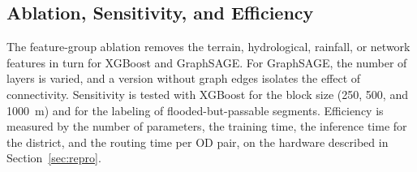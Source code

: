 \subsection{Ablation, Sensitivity, and Efficiency}
The feature-group ablation removes the terrain, hydrological, rainfall, or network features in turn for XGBoost and GraphSAGE. For GraphSAGE, the number of layers is varied, and a version without graph edges isolates the effect of connectivity. Sensitivity is tested with XGBoost for the block size (250, 500, and 1000~m) and for the labeling of flooded-but-passable segments. Efficiency is measured by the number of parameters, the training time, the inference time for the district, and the routing time per OD pair, on the hardware described in Section~\ref{sec:repro}.
